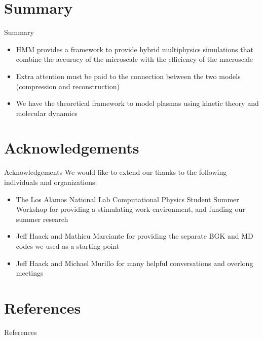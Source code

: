 \documentclass{beamer}
\begin{document}
	\section{Summary}
	\begin{frame}{Summary}
		\begin{itemize}
			\item HMM provides a framework to provide hybrid multiphysics simulations that combine the accuracy of the microscale with the efficiency of the macroscale
			\vspace{1em}
			\item Extra attention must be paid to the connection between the two models (compression and reconstruction)
			\vspace{1em}
			\item We have the theoretical framework to model plasmas using kinetic theory and molecular dynamics
		\end{itemize}
	\end{frame}
	
	\section{Acknowledgements}
	\begin{frame}{Acknowledgements}
		We would like to extend our thanks to the following individuals and organizations:\vspace{1em}
		\begin{itemize}
		\item The Los Alamos National Lab Computational Physics Student Summer Workshop for providing a stimulating work environment, and funding our summer research\vspace{1em}
		\item Jeff Haack and Mathieu Marciante for providing the separate BGK and MD codes we used as a starting point\vspace{1em}
		\item Jeff Haack and Michael Murillo for many helpful conversations and overlong meetings
		\end{itemize}
	\end{frame}
	
	\section{References}
	\begin{frame}[allowframebreaks]{References}
	\nocite{weinan2007heterogeneous,weinan2011principles,klimontovich1983kinetic,ren2005heterogeneous,franklin2000boltzmann,hadjiconstantinou1997heterogeneous,flekkoy2000hybrid,nie2004continuum,li1999nearly}
		
	\end{frame}
	
\end{document}
